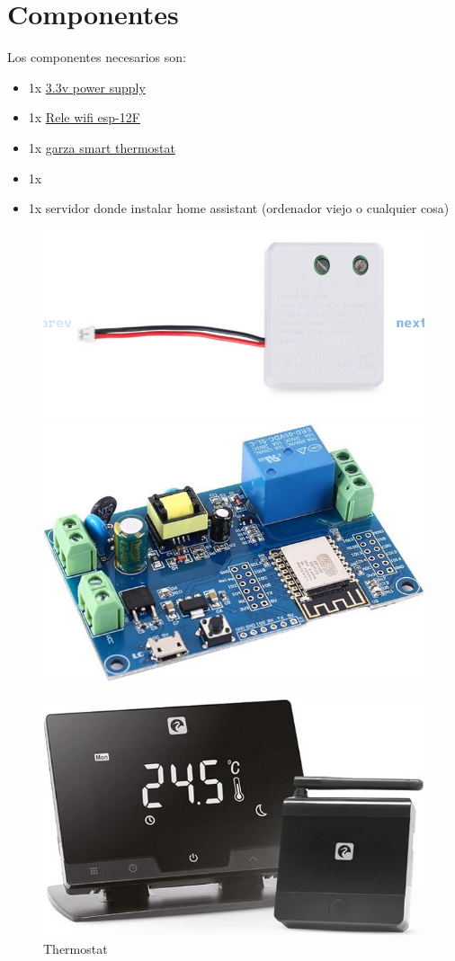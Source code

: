 \documentclass{report}
\begin{document}
\setcounter{chapter}{1}
\section{Componentes}\label{sec:componentes}
Los componentes necesarios son:
\begin{itemize}
  \item1x \href{https://www.barcelonaled.com/en/power-supply-33v-for-touch-panels-mi-light.html}{3.3v power supply}
  \item1x \href{https://www.barcelonaled.com/en/power-supply-33v-for-touch-panels-mi-light.html}{Rele wifi esp-12F}
  \item1x \href{https://www.amazon.es/Garza-Smarthome-Inteligente-Calefacci%C3%B3n-programable/dp/B07YDYNSB3?th=1}{garza smart thermostat}
  \item1x 
  \item1x servidor donde instalar home assistant (ordenador viejo o cualquier cosa)  
\end{itemize}
\begin{figure}[h]%
\centering
\begin{minipage}{.50\textwidth}
      \centering
      \includegraphics[width=.45\linewidth]{figures/psu.png}
  \end{minipage}%
  \begin{minipage}{.50\textwidth}
    \centering
    \includegraphics[width=.45\linewidth]{figures/relay.png}
  \end{minipage}%
\end{figure}
\begin{figure}[h]
    \centering
    \includegraphics[width=.45\textwidth]{figures/thermostat.png}
    \caption{Thermostat}
  \end{figure}
\end{document}
